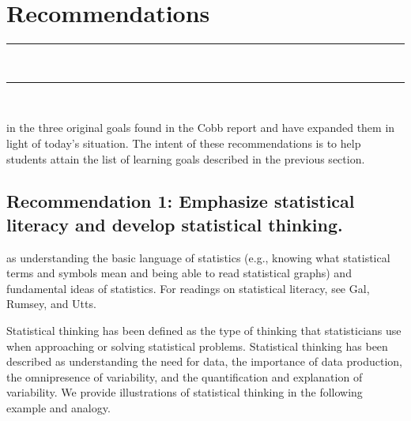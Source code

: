 \chapter{Recommendations}
\vspace{-.53in}
   \noindent\color{graylight}\rule[0cm]{3.25in}{0.03cm} \\
    \noindent\color{graylight}\rule[0.4cm]{3.25in}{0.03cm} \\
\color{black}
\vspace{.05in}
 
 in the three original goals found in the Cobb report\cite{cobb1} and have expanded them in light of today's situation. The intent of these recommendations is to help students attain the list of learning goals described in the previous section.
 
 
\section{\textbf{Recommendation 1: Emphasize statistical literacy and develop statistical thinking.}}
 
 as understanding the basic language of statistics (e.g., knowing what statistical terms and symbols mean and being able to read statistical graphs) and fundamental ideas of statistics. For readings on statistical literacy, see Gal\cite{gal}, Rumsey\cite{rumsey}, and Utts\cite{utts}.
 
Statistical thinking has been defined as the type of thinking that statisticians use when approaching or solving statistical problems. Statistical thinking has been described as understanding the need for data, the importance of data production, the omnipresence of variability, and the quantification and explanation of variability\cite{cobb1}. We provide illustrations of statistical thinking in the following example and analogy.

